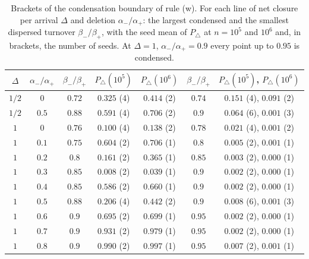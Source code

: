 \documentclass[aps,pre,twocolumn,superscriptaddress,floatfix,nofootinbib]{revtex4-2}
\begin{document}
\begin{table}[t]
\caption{Brackets of the condensation boundary of rule (w). For each line of
net closure per arrival $\Delta$ and deletion $\alpha_-/\alpha_+$: the largest
condensed and the smallest dispersed turnover $\beta_-/\beta_+$, with the seed
mean of $P_\triangle$ at $n=10^5$ and $10^6$ and, in brackets, the number of
seeds. At $\Delta=1$, $\alpha_-/\alpha_+=0.9$ every point up to $0.95$ is
condensed.}
\label{tab:brackets}
\begin{ruledtabular}
\begin{tabular}{ccccccc}
$\Delta$ & $\alpha_-/\alpha_+$ & $\beta_-/\beta_+$ & $P_\triangle(10^5)$ & $P_\triangle(10^6)$ & $\beta_-/\beta_+$ & $P_\triangle(10^5)$, $P_\triangle(10^6)$\\
\hline
$1/2$ & $0$ & $0.72$ & $0.325$ (4) & $0.414$ (2) & $0.74$ & $0.151$ (4), $0.091$ (2)\\
$1/2$ & $0.5$ & $0.88$ & $0.591$ (4) & $0.706$ (2) & $0.9$ & $0.064$ (6), $0.001$ (3)\\
$1$ & $0$ & $0.76$ & $0.100$ (4) & $0.138$ (2) & $0.78$ & $0.021$ (4), $0.001$ (2)\\
$1$ & $0.1$ & $0.75$ & $0.604$ (2) & $0.706$ (1) & $0.8$ & $0.005$ (2), $0.001$ (1)\\
$1$ & $0.2$ & $0.8$ & $0.161$ (2) & $0.365$ (1) & $0.85$ & $0.003$ (2), $0.000$ (1)\\
$1$ & $0.3$ & $0.85$ & $0.008$ (2) & $0.039$ (1) & $0.9$ & $0.002$ (2), $0.000$ (1)\\
$1$ & $0.4$ & $0.85$ & $0.586$ (2) & $0.660$ (1) & $0.9$ & $0.002$ (2), $0.000$ (1)\\
$1$ & $0.5$ & $0.88$ & $0.206$ (4) & $0.442$ (2) & $0.9$ & $0.008$ (6), $0.001$ (3)\\
$1$ & $0.6$ & $0.9$ & $0.695$ (2) & $0.699$ (1) & $0.95$ & $0.002$ (2), $0.000$ (1)\\
$1$ & $0.7$ & $0.9$ & $0.931$ (2) & $0.979$ (1) & $0.95$ & $0.002$ (2), $0.000$ (1)\\
$1$ & $0.8$ & $0.9$ & $0.990$ (2) & $0.997$ (1) & $0.95$ & $0.007$ (2), $0.001$ (1)\\
\end{tabular}
\end{ruledtabular}
\end{table}
\end{document}
